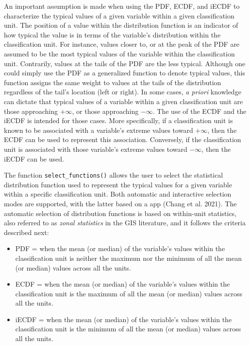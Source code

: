 An important assumption is made when using the PDF, ECDF, and iECDF to
characterize the typical values of a given variable within a given
classification unit. The position of a value within the distribution function is
an indicator of how typical the value is in terms of the variable's distribution
within the classification unit. For instance, values closer to, or at the peak
of the PDF are assumed to be the most typical values of the variable within the
classification unit. Contrarily, values at the tails of the PDF are the less
typical. Although one could simply use the PDF as a generalized function to
denote typical values, this function assigns the same weight to values at the
tails of the distribution regardless of the tail's location (left or right). In
some cases, \emph{a priori} knowledge can dictate that typical values of a variable
within a given classification unit are those approaching \(+\infty\), or those
approaching \(-\infty\). The use of the ECDF and the iECDF is intended for those
cases. More specifically, if a classification unit is known to be associated
with a variable's extreme values toward \(+\infty\), then the ECDF can be used to
represent this association. Conversely, if the classification unit is associated
with those variable's extreme values toward \(-\infty\), then the iECDF can be
used.

The function \texttt{select\_functions()} allows the user to select the statistical
distribution function used to represent the typical values for a given variable
within a specific classification unit. Both automatic and interactive selection
modes are supported, with the latter based on a  app
(Chang et al. 2021). The automatic selection of distribution functions is based on
within-unit statistics, also referred to as \emph{zonal statistics} in the GIS
literature, and it follows the criteria described next:

\begin{itemize}
\tightlist
\item
  PDF = when the mean (or median) of the variable's values within the
  classification unit is neither the maximum nor the minimum of all the mean (or
  median) values across all the units.
\item
  ECDF = when the mean (or median) of the variable's values within the
  classification unit is the maximum of all the mean (or median) values across all
  the units.
\item
  iECDF = when the mean (or median) of the variable's values within the
  classification unit is the minimum of all the mean (or median) values across all
  the units.
\end{itemize}

